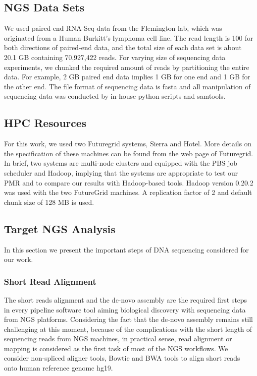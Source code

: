 \documentclass{acm_proc_article-sp}
\begin{document}
\subsection{NGS Data Sets}
We used paired-end RNA-Seq data from the Flemington lab, which was originated from a Human Burkitt's lymphoma cell line\cite{erik_2010}. The read length is 100 for both directions of paired-end data, and the total size of each data set is about 20.1 GB containing 70,927,422 reads.  For varying size of sequencing data experiments, we chunked the required amount of reads by partitioning the entire data.  For example, 2 GB paired end data implies 1 GB for one end and 1 GB for the other end.  The file format of sequencing data is fasta and all manipulation of sequencing data was conducted by in-house python scripts and samtools\cite{samtools}.  

\subsection{HPC Resources}
For this work, we used two Futuregrid systems, Sierra and Hotel.  More details on the specification of these machines can be found from the web page of Futuregrid\cite{futuregrid_url}.  In brief, two systems are multi-node clusters and equipped with the PBS job scheduler and Hadoop, implying that the systems are appropriate to test our PMR and to compare our results with Hadoop-based tools. Hadoop version 0.20.2 was used with the two FutureGrid machines. A replication factor of 2 and default chunk size of 128 MB is used. 

\subsection{Target NGS Analysis}
In this section we present the important steps of DNA sequencing considered for our work. 

\subsubsection{Short Read Alignment}
The short reads alignment and the de-novo assembly are the required first steps in every pipeline software tool aiming biological discovery with sequencing data from NGS platforms.  Considering the fact that the de-novo assembly remains still challenging at this moment, because of the complications with the short length of sequencing reads from NGS machines, in practical sense,  read alignment or mapping is considered as the first task of most of the NGS workflows. We consider non-spliced aligner tools, Bowtie and BWA tools to align short reads onto human reference genome hg19.
\end{document}
